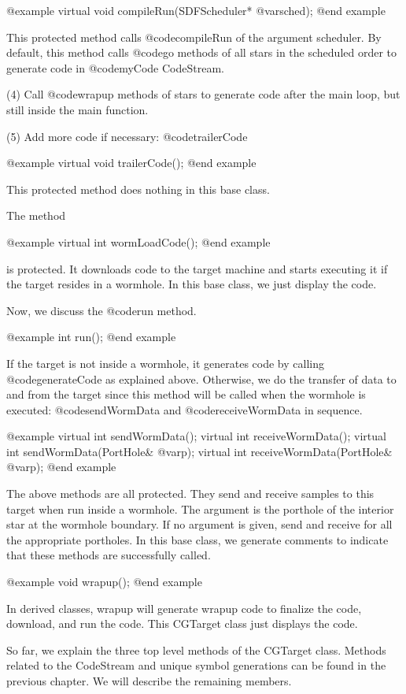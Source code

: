 @example
virtual void compileRun(SDFScheduler* @var{sched});
@end example

This protected method calls @code{compileRun} of the argument scheduler. 
By default, this method calls @code{go} methods of all stars in the
scheduled order to generate code in @code{myCode} CodeStream.

(4) Call @code{wrapup} methods of stars to generate code after the main
loop, but still inside the main function.

(5) Add more code if necessary: @code{trailerCode}

@example
virtual void trailerCode();
@end example

This protected method does nothing in this base class.

The method

@example
virtual int wormLoadCode();
@end example

is protected. It downloads code to the target machine
and starts executing it if the target resides in a wormhole. In this
base class, we just display the code.

Now, we discuss the @code{run} method.

@example
int run();
@end example

If the target is not inside a wormhole, it generates code by calling
@code{generateCode} as explained above. Otherwise, we do the transfer of
data to and from the target since this method will be called when the
wormhole is executed: @code{sendWormData} and @code{receiveWormData}
in sequence.

@example
virtual int sendWormData();
virtual int receiveWormData();
virtual int sendWormData(PortHole& @var{p});
virtual int receiveWormData(PortHole& @var{p});
@end example

The above methods are all protected. They send and receive samples to this
target when run inside a wormhole. The argument is the porthole of the
interior star at the wormhole boundary. If no argument is given, send and
receive for all the appropriate portholes. In this base class, we generate
comments to indicate that these methods are successfully called.

@example
void wrapup();
@end example

In derived classes, wrapup will generate wrapup code to finalize the code,
download, and run the code. This CGTarget class just displays the code.

So far, we explain the three top level methods of the CGTarget class.
Methods related to the CodeStream and unique symbol generations can
be found in the previous chapter. We will describe the remaining members.

